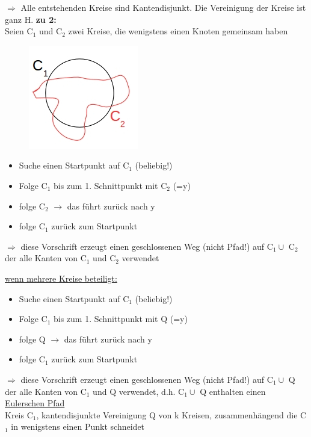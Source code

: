 $\Rightarrow$ Alle entstehenden Kreise sind Kantendisjunkt. Die Vereinigung der Kreise ist ganz H.
\newpage
\textbf{zu 2:}\\
Seien C$_1$ und C$_2$ zwei Kreise, die wenigstens einen Knoten gemeinsam haben
\begin{figure}[htp]
\centering
\includegraphics[scale=0.75]{lectures/161104/pix/pic4.jpg}
\end{figure}

\begin{itemize}
	\item Suche einen Startpunkt auf C$_1$ (beliebig!)
	\item Folge C$_1$ bis zum 1. Schnittpunkt mit C$_2$ (=y)
	\item folge C$_2$ $\rightarrow$ das führt zurück nach y
	\item folge C$_1$ zurück zum Startpunkt
\end{itemize}

$\Rightarrow$ diese Vorschrift erzeugt einen geschlossenen Weg (nicht Pfad!) auf C$_1 \cup$ C$_2$ der alle Kanten von C$_1$ und C$_2$ verwendet

\underline{wenn mehrere Kreise beteiligt:}\\
\begin{itemize}
	\item Suche einen Startpunkt auf C$_1$ (beliebig!)
	\item Folge C$_1$ bis zum 1. Schnittpunkt mit Q (=y)
	\item folge Q $\rightarrow$ das führt zurück nach y
	\item folge C$_1$ zurück zum Startpunkt
\end{itemize}

$\Rightarrow$ diese Vorschrift erzeugt einen geschlossenen Weg (nicht Pfad!) auf C$_1 \cup$ Q der alle Kanten von C$_1$ und Q verwendet, d.h. C$_1 \cup$ Q enthalten einen \underline{Eulerschen Pfad}\\

Kreis C$_1$, kantendisjunkte Vereinigung Q von k Kreisen, zusammenhängend die C$_1$ in wenigstens einen Punkt schneidet

